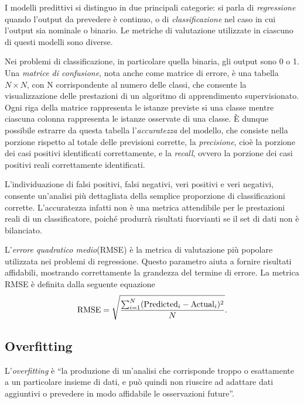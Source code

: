 I modelli predittivi si distinguo in due principali categorie: si parla di \emph{regressione} quando l'output da prevedere è continuo, o di \emph{classificazione} nel caso in cui l'output sia nominale o binario. Le metriche di valutazione utilizzate in ciascuno di questi modelli sono diverse.

Nei problemi di classificazione, in particolare quella binaria, gli output sono 0 o 1. 
Una \emph{matrice di confusione}, nota anche come matrice di errore, è una tabella $N \times N$, con N corrispondente al numero delle classi, che consente la visualizzazione delle prestazioni di un algoritmo di apprendimento supervisionato. Ogni riga della matrice rappresenta le istanze previste si una classe mentre ciascuna colonna rappresenta le istanze osservate di una classe. 
È dunque possibile estrarre da questa tabella l'\emph{accuratezza} del modello, che consiste nella porzione rispetto al totale delle previsioni corrette, la \emph{precisione}, cioè la porzione dei casi positivi identificati correttamente, e la \emph{recall}, ovvero la porzione dei casi positivi reali correttamente identificati. 

L'individuazione di falsi positivi, falsi negativi, veri positivi e veri negativi, consente un'analisi più dettagliata della semplice proporzione di classificazioni corrette. L'accuratezza infatti non è una metrica attendibile per le prestazioni reali di un classificatore, poiché produrrà risultati fuorvianti se il set di dati non è bilanciato.

L'\emph{errore quadratico medio}(RMSE) è la metrica di valutazione più popolare utilizzata nei problemi di regressione. Questo parametro aiuta a fornire risultati affidabili, mostrando correttamente la grandezza del termine di errore.
La metrica RMSE è definita dalla seguente equazione
\begin{equation}
	\operatorname{RMSE} = \sqrt{\frac{\sum_{i=1}^{N}(\mbox{Predicted}_i - \mbox{Actual}_i)^2}{N}} \mbox{.}
	\label{eq:rmse}
\end{equation}

\subsection{Overfitting}
\label{subsec:overfitting}

L'\emph{overfitting} è ``la produzione di un'analisi che corrisponde troppo o esattamente a un particolare insieme di dati, e può quindi non riuscire ad adattare dati aggiuntivi o prevedere in modo affidabile le osservazioni future''.

